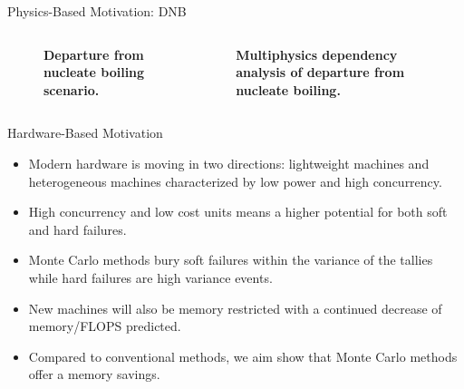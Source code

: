 \documentclass{beamer}
\begin{document}
\begin{frame}{Physics-Based Motivation: DNB}

  \begin{columns}

    \begin{column}{0.35\textwidth}
      \begin{figure}[htpb!]
        \begin{center}
          \scalebox{1}{  }
        \end{center}
        \caption{\textbf{Departure from nucleate boiling scenario.} }
      \end{figure}
    \end{column}

    \begin{column}{0.65\textwidth}
      \begin{figure}[htpb!]
        \begin{center}
          \scalebox{0.8}{  }
        \end{center}
        \caption{\textbf{Multiphysics dependency analysis of departure
            from nucleate boiling.} }
      \end{figure}
    \end{column}

  \end{columns}

\end{frame}

\begin{frame}{Hardware-Based Motivation}
  \begin{itemize}
    \item Modern hardware is moving in two directions: lightweight
      machines and heterogeneous machines characterized by low power
      and high concurrency.
    \item High concurrency and low cost units means a higher potential
      for both soft and hard failures.
    \item Monte Carlo methods bury soft failures within the variance
      of the tallies while hard failures are high variance events.
    \item New machines will also be memory restricted with a continued
      decrease of memory/FLOPS predicted.
    \item Compared to conventional methods, we aim show that Monte
      Carlo methods offer a memory savings.
  \end{itemize}
\end{frame}
\end{document}

